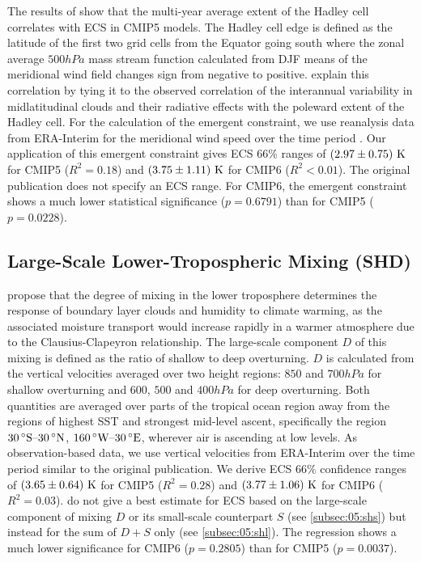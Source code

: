 The results of \textcite{Lipat2017} show that the multi-year average extent of
the Hadley cell correlates with \acs{ECS} in \acs{CMIP}5 models. The Hadley
cell edge is defined as the latitude of the first two grid cells from the
Equator going south where the zonal average $500 \unit{hPa}$ mass stream
function calculated from \ac{DJF} means of the meridional wind field changes
sign from negative to positive. \Textcite{Lipat2017} explain this correlation
by tying it to the observed correlation of the interannual variability in
midlatitudinal clouds and their radiative effects with the poleward extent of
the Hadley cell. For the calculation of the emergent constraint, we use
reanalysis data from ERA-Interim \autocite{Dee2011} for the meridional wind
speed over the time period . Our application of this emergent
constraint gives \ac{ECS} $66 \unit{\%}$ ranges of
$\pmrangeunit{2.97}{0.75}{K}$ for \acs{CMIP}5 ($R^2 = 0.18$) and
$\pmrangeunit{3.75}{1.11}{K}$ for \acs{CMIP}6 ($R^2 < 0.01$). The original
publication does not specify an \ac{ECS} range. For \acs{CMIP}6, the emergent
constraint shows a much lower statistical significance ($p = 0.6791$) than for
\acs{CMIP}5 ($p = 0.0228$).


\subsection{Large-Scale Lower-Tropospheric Mixing (SHD)}
\label{subsec:05:shd}

\textcite{Sherwood2014} propose that the degree of mixing in the lower
troposphere determines the response of boundary layer clouds and humidity to
climate warming, as the associated moisture transport would increase rapidly in
a warmer atmosphere due to the Clausius-Clapeyron relationship. The large-scale
component $D$ of this mixing is defined as the ratio of shallow to deep
overturning. $D$ is calculated from the vertical velocities averaged over two
height regions: $850$ and $700 \unit{hPa}$ for shallow overturning and $600$,
$500$ and $400 \unit{hPa}$ for deep overturning. Both quantities are averaged
over parts of the tropical ocean region away from the regions of highest
\ac{SST} and strongest mid-level ascent, specifically the region $\range{30
  \unit{\degree S}}{30 \unit{\degree N}}$, $\range{160 \unit{\degree W}}{30
  \unit{\degree E}}$, wherever air is ascending at low levels. As
observation-based data, we use vertical velocities from ERA-Interim
\autocite{Dee2011} over the time period  similar to the
original publication. We derive \ac{ECS} $66 \unit{\%}$ confidence ranges of
$\pmrangeunit{3.65}{0.64}{K}$ for \acs{CMIP}5 ($R^2 = 0.28$) and
$\pmrangeunit{3.77}{1.06}{K}$ for \acs{CMIP}6 ($R^2 = 0.03$).
\Textcite{Sherwood2014} do not give a best estimate for \ac{ECS} based on the
large-scale component of mixing $D$ or its small-scale counterpart $S$ (see
\cref{subsec:05:shs}) but instead for the sum of $D + S$ only (see
\cref{subsec:05:shl}). The regression shows a much lower significance for
\acs{CMIP}6 ($p = 0.2805$) than for \acs{CMIP}5 ($p = 0.0037$).

